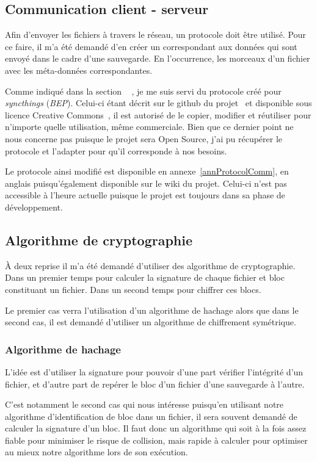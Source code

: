 \documentclass[a4paper,10pt, twoside]{report}
\begin{document}
\begin{spacing}{1.2}
\subsection{Communication client - serveur}
Afin d'envoyer les fichiers à travers le réseau, un protocole doit être
utilisé. Pour ce faire, il m'a été demandé d'en créer un correspondant
aux données qui sont envoyé dans le cadre d'une sauvegarde. En l'occurrence,
les morceaux d'un fichier avec les méta-données correspondantes.

Comme indiqué dans la section \flqq~ \frqq, je me
suis servi du protocole créé pour \textit{syncthings} (\textit{BEP}).
Celui-ci étant décrit sur le github du projet~\cite{refBEP} et
disponible sous licence Creative Commons~\cite{refCC4.0}, il est autorisé de
le copier, modifier et réutiliser pour n'importe quelle utilisation, même
commerciale. Bien que ce dernier point ne nous concerne pas puisque le projet
sera Open Source, j'ai pu récupérer le protocole et l'adapter pour qu'il
corresponde à nos besoins.

Le protocole ainsi modifié est disponible en annexe~\ref{annProtocolComm}, en
anglais puisqu'également disponible sur le wiki du projet. Celui-ci n'est pas
accessible à l'heure actuelle puisque le projet est toujours dans sa phase de
développement.

\subsection{Algorithme de cryptographie}
À deux reprise il m'a été demandé d'utiliser des algorithme de
cryptographie. Dans un premier temps pour calculer la signature de chaque
fichier et bloc constituant un fichier. Dans un second temps pour chiffrer
ces blocs.

Le premier cas verra l'utilisation d'un algorithme de hachage alors que dans le
second cas, il est demandé d'utiliser un algorithme de chiffrement
symétrique.

\subsubsection{Algorithme de hachage}
L'idée est d'utiliser la signature pour pouvoir d'une part vérifier
l'intégrité d'un fichier, et d'autre part de repérer le bloc d'un fichier
d'une sauvegarde à l'autre.

C'est notamment le second cas qui nous intéresse puisqu'en utilisant notre
algorithme d'identification de bloc dans un fichier, il sera souvent demandé
de calculer la signature d'un bloc. Il faut donc un algorithme qui soit à la
fois assez fiable pour minimiser le risque de collision, mais rapide à
calculer pour optimiser au mieux notre algorithme lors de son exécution.


\end{spacing}
\end{document}
